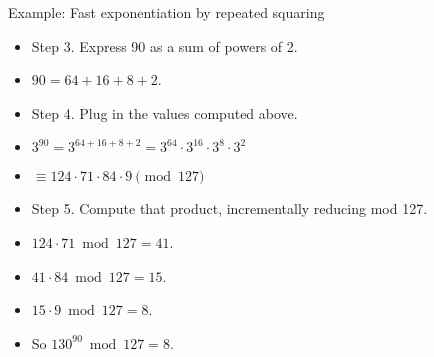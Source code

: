\documentclass[handout]{beamer}
\begin{document}
\begin{frame}{Example: Fast exponentiation by repeated squaring}
\begin{itemize}
  \item Step 3. Express 90 as a sum of powers of 2.
  \item $90 = 64+16+8+2$.
  \item Step 4. Plug in the values computed above.
  \item $3^{90} = 3^{64+16+8+2} = 3^{64} \cdot 3^{16} \cdot 3^{8} \cdot 3^{2}$
  \item $\equiv 124 \cdot 71 \cdot 84 \cdot 9  \pmod {127}$
  \item Step 5. Compute that product, incrementally reducing mod 127.
  \item $124 \cdot 71 \bmod 127 = 41$.
  \item $41 \cdot 84 \bmod 127 = 15$.
  \item $15 \cdot 9 \bmod 127 = 8$.
  \item So $130^{90} \bmod 127 = 8$.
\end{itemize}
\end{frame}
\end{document}
